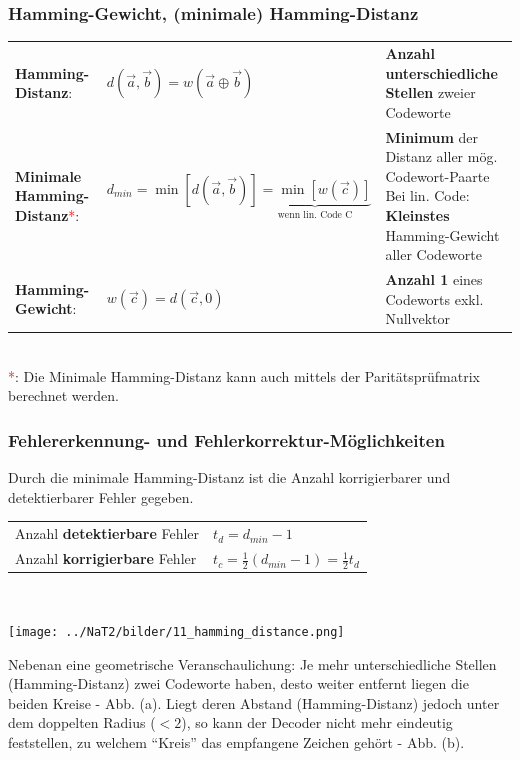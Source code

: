 \subsubsection{Hamming-Gewicht, (minimale) Hamming-Distanz }
\renewcommand{\arraystretch}{1.4}
\begin{tabular}[c]{ p{5.0cm}  p{5.0cm} p{9cm} }
	\textbf{Hamming-Distanz}:
	& $d(\vec{a},\vec{b}) = w(\vec{a} \oplus \vec{b})$
	& \textbf{Anzahl unterschiedliche Stellen} zweier Codeworte \\
	\textbf{Minimale Hamming-Distanz}\textcolor{red}{*}:
	& $d_{min} = \min[d(\vec{a},\vec{b})] \underbrace{= \min{[w(\vec{c})]}}_{\text{wenn lin. Code C}}$
	& \parbox[c]{9cm}{\textbf{Minimum} der Distanz aller mög. Codewort-Paarte\\
	Bei lin. Code: \textbf{Kleinstes} Hamming-Gewicht aller Codeworte} \\
	\textbf{Hamming-Gewicht}: 
	& $w(\vec{c}) = d(\vec{c},0)$
	& \textbf{Anzahl 1} eines Codeworts exkl. Nullvektor
\end{tabular}
\renewcommand{\arraystretch}{1} \\
\textcolor{red}{*}: Die Minimale Hamming-Distanz kann auch mittels der Paritätsprüfmatrix
 berechnet werden.


\subsubsection{Fehlererkennung- und Fehlerkorrektur-Möglichkeiten}
Durch die minimale Hamming-Distanz ist die Anzahl korrigierbarer und detektierbarer Fehler
gegeben. \\
\renewcommand{\arraystretch}{1.4}
\begin{tabular}[c]{ p{5.5cm}  p{13cm} }
	Anzahl \textbf{detektierbare} Fehler & $t_d = d_{min} - 1$ \\
	Anzahl \textbf{korrigierbare} Fehler & $t_c = \frac12 (d_{min} - 1) = \frac12 t_d$
\end{tabular}
\renewcommand{\arraystretch}{1} \\

\begin{minipage}{7.5cm}
	\texttt{[image: ../NaT2/bilder/11\_hamming\_distance.png]}
\end{minipage}
\begin{minipage}{11.5cm}
	Nebenan eine geometrische Veranschaulichung: Je mehr unterschiedliche Stellen (Hamming-Distanz)
	zwei Codeworte haben, desto weiter entfernt liegen die beiden Kreise - Abb. (a). Liegt deren
	Abstand (Hamming-Distanz) jedoch unter dem doppelten Radius ($< 2$), so kann der Decoder nicht mehr
	eindeutig feststellen, zu welchem ``Kreis'' das empfangene Zeichen gehört - Abb. (b).
\end{minipage} 


